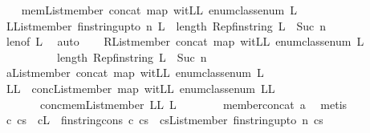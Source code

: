 \begin{isabellebody}
\ \ \isamarkupfalse%
\ mem{\isacharcolon}{\isachardoublequoteopen}List{\isachardot}member\ {\isacharparenleft}concat\ {\isacharparenleft}map\ {\isacharquery}witLL\ enum{\isacharunderscore}class{\isachardot}enum{\isacharparenright}{\isacharparenright}\ L{\isachardoublequoteclose}\isanewline
\ \ \isamarkupfalse%
\ L{\isacharcolon}{\isachardoublequoteopen}List{\isachardot}member\ {\isacharparenleft}fin{\isacharunderscore}string{\isacharunderscore}upto\ n{\isacharparenright}\ L\ {\isasymLongrightarrow}\ length\ {\isacharparenleft}Rep{\isacharunderscore}fin{\isacharunderscore}string\ L{\isacharparenright}\ {\isasymle}\ Suc\ n{\isachardoublequoteclose}\ \isanewline
\ \ \ \ \isamarkupfalse%
\ len{\isacharbrackleft}of\ L{\isacharbrackright}\ \isamarkupfalse%
\ auto\isanewline
\ \ \isamarkupfalse%
\ R{\isacharcolon}{\isachardoublequoteopen}List{\isachardot}member\ {\isacharparenleft}concat\ {\isacharparenleft}map\ {\isacharquery}witLL\ enum{\isacharunderscore}class{\isachardot}enum{\isacharparenright}{\isacharparenright}\ L\isanewline
\ \ \ \ \ \ \ \ \ {\isasymLongrightarrow}\ length\ {\isacharparenleft}Rep{\isacharunderscore}fin{\isacharunderscore}string\ L{\isacharparenright}\ {\isasymle}\ Suc\ n{\isachardoublequoteclose}\ \isanewline
\ \ \isamarkupfalse%
\ {\isacharminus}\isanewline
\ \ \ \ \isamarkupfalse%
\ a{\isacharcolon}{\isachardoublequoteopen}List{\isachardot}member\ {\isacharparenleft}concat\ {\isacharparenleft}map\ {\isacharquery}witLL\ enum{\isacharunderscore}class{\isachardot}enum{\isacharparenright}{\isacharparenright}\ L{\isachardoublequoteclose}\isanewline
\ \ \ \ \isamarkupfalse%
\ LL\ \ conc{\isacharcolon}{\isachardoublequoteopen}List{\isachardot}member\ {\isacharparenleft}map\ {\isacharquery}witLL\ enum{\isacharunderscore}class{\isachardot}enum{\isacharparenright}\ LL{\isachardoublequoteclose}\isanewline
\ \ \ \ \ \ \ concmem{\isacharcolon}{\isachardoublequoteopen}List{\isachardot}member\ LL\ L{\isachardoublequoteclose}\isanewline
\ \ \ \ \ \ \isamarkupfalse%
\ member{\isacharunderscore}concat\ a\ \isamarkupfalse%
\ metis\isanewline
\ \ \ \ \isamarkupfalse%
\ c\ cs\ \ c{\isacharcolon}{\isachardoublequoteopen}L\ {\isacharequal}\ fin{\isacharunderscore}string{\isacharunderscore}cons\ c\ cs{\isachardoublequoteclose}\ \ cs{\isacharcolon}{\isachardoublequoteopen}List{\isachardot}member\ {\isacharparenleft}fin{\isacharunderscore}string{\isacharunderscore}upto\ n{\isacharparenright}\ cs{\isachardoublequoteclose}\isanewline

\end{isabellebody}
